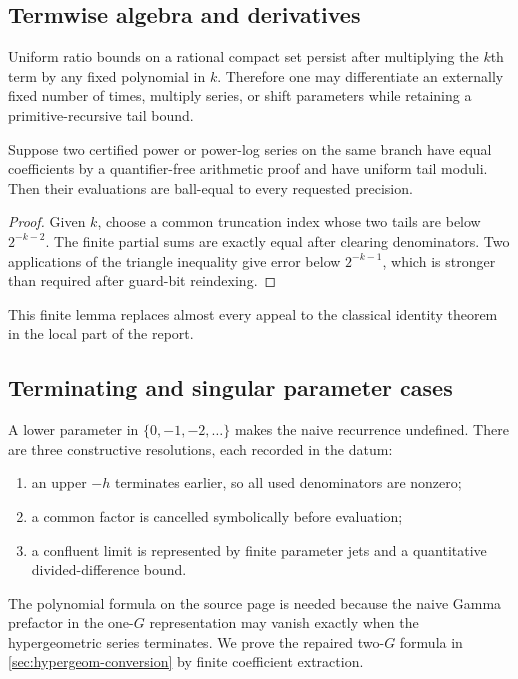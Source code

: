 \subsection{Termwise algebra and derivatives}

Uniform ratio bounds on a rational compact set persist after multiplying the
$k$th term by any fixed polynomial in $k$.  Therefore one may differentiate an
externally fixed number of times, multiply series, or shift parameters while
retaining a primitive-recursive tail bound.

\begin{lemma}\label{lem:coeff-id}
Suppose two certified power or power-log series on the same branch have equal
coefficients by a quantifier-free arithmetic proof and have uniform tail
moduli.  Then their evaluations are ball-equal to every requested precision.
\end{lemma}
\begin{proof}
Given $k$, choose a common truncation index whose two tails are below
$2^{-k-2}$.  The finite partial sums are exactly equal after clearing
 denominators.  Two applications of the triangle inequality give error below
$2^{-k-1}$, which is stronger than required after guard-bit reindexing.
\end{proof}
This finite lemma replaces almost every appeal to the classical identity
theorem in the local part of the report.

\subsection{Terminating and singular parameter cases}

A lower parameter in $\{0,-1,-2,\ldots\}$ makes the naive recurrence undefined.
There are three constructive resolutions, each recorded in the datum:
\begin{enumerate}
\item an upper $-h$ terminates earlier, so all used denominators are nonzero;
\item a common factor is cancelled symbolically before evaluation;
\item a confluent limit is represented by finite parameter jets and a
      quantitative divided-difference bound.
\end{enumerate}
The polynomial formula on the source page is needed because the naive Gamma
prefactor in the one-$G$ representation may vanish exactly when the
hypergeometric series terminates.  We prove the repaired two-$G$ formula in
\cref{sec:hypergeom-conversion} by finite coefficient extraction.
